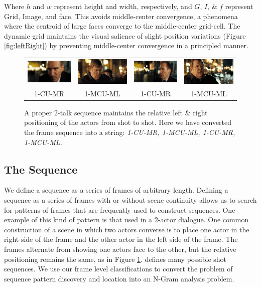 Where $h$ and $w$ represent height and width, respectively, and $G$, $I$, \& $f$ represent Grid, Image, and face. This avoids middle-center convergence, a phenomena where the centroid of large faces converge to the middle-center grid-cell. The dynamic grid  maintains the visual salience of slight position variations (Figure \ref{fig:leftRight}) by preventing middle-center convergence in a principled manner. 
\begin{figure}
\begin{center}
\begin{tabular}{c c c c}
\includegraphics[width=0.22\linewidth]
  {fig/r1.jpg}
& \includegraphics[width=0.22\linewidth]
  {fig/l1.jpg}
& \includegraphics[width=0.22\linewidth]
  {fig/r2.jpg}
& \includegraphics[width=0.22\linewidth]
  {fig/l2.jpg}
\\
\large{1-CU-MR} & \large{1-MCU-ML} & \large{1-CU-MR} & \large{1-MCU-ML} \\
\end{tabular}
\end{center}
\caption{A proper 2-talk sequence maintains the relative left \& right positioning of the actors from shot to shot. Here we have converted the frame sequence into a string: \textit{1-CU-MR, 1-MCU-ML, 1-CU-MR, 1-MCU-ML.}}
\label{fig:2talk}
\end{figure}

\subsection*{The Sequence}
We define a sequence as a series of frames of arbitrary length. Defining a sequence as a series of frames with or without scene continuity allows us to search for patterns of frames that are frequently used to construct sequences. One example of this kind of pattern is that used in a 2-actor dialogue. One common construction of a scene in which two actors converse is to place one actor in the right side of the frame and the other actor in the left side of the frame. The frames alternate from showing one actors face to the other, but the relative positioning remains the same, as in Figure \ref{fig:2talk}. \cite{arijon_grammar_1991} defines many possible shot sequences. We use our frame level classifications to convert the problem of sequence pattern discovery and location into an N-Gram analysis problem.

